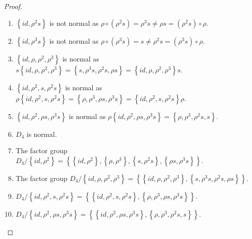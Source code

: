 \documentclass{article}
\theoremstyle{definition}
\begin{document}
\begin{proof}
\begin{enumerate}
			\item $\left\{id, \rho^2 s\right\}$ is not normal as $\rho \circ \left(\rho^2 s\right) = \rho^3 s \not= \rho s = \left(\rho^2 s\right)\circ \rho$.
				
			\item $\left\{id, \rho^3 s\right\}$ is not normal as $\rho \circ \left(\rho^3 s\right) = s \not= \rho^2 s = \left(\rho^3 s\right) \circ \rho$.
				
			\item $\left\{id, \rho, \rho^2, \rho^3 \right\}$ is normal as $s \left\{id, \rho, \rho^2, \rho^3 \right\} = \left\{s, \rho^3 s, \rho^2 s, \rho s \right\} = \left\{id, \rho, \rho^2, \rho^3 \right\} s$. \checkmark 
				
			\item $\left\{id, \rho^2, s, \rho^2 s\right\}$ is normal as $\rho \left\{id, \rho^2, s, \rho^2 s\right\} = \left\{\rho, \rho^3, \rho s, \rho^3 s \right\} = \left\{id, \rho^2, s, \rho^2 s\right\}\rho$. \checkmark
				
			\item $\left\{id, \rho^2, \rho s, \rho^3 s \right\}$ is normal as $\rho \left\{id, \rho^2, \rho s, \rho^3 s \right\} = \left\{\rho, \rho^3, \rho^2 s, s \right\}$. \checkmark 
				
			\item $D_4$ is normal.
				
			\setcounter{enumi}{1}
			\item The factor group $D_4/\left\{id, \rho^2\right\} = \left\{ \left\{ id, \rho^2\right\}, \left\{\rho, \rho^3\right\}, \left\{s, \rho^2 s\right\}, \left\{\rho s, \rho^3 s\right\} \right\}$. 
			
			\setcounter{enumi}{6}
			\item The factor group $D_4/\left\{id, \rho, \rho^2, \rho^3 \right\} = \left\{ \left\{id, \rho, \rho^2, \rho^3 \right\}, \left\{ s, \rho^3 s, \rho^2 s, \rho s \right\} \right\}$.
			
			\item $D_4/\left\{id, \rho^2, s, \rho^2 s\right\} = \left\{ \left\{id, \rho^2, s, \rho^2 s\right\}, \left\{\rho, \rho^3, \rho s, \rho^3 s \right\}\right\}$.
			
			\item $D_4/\left\{id, \rho^2, \rho s, \rho^3 s \right\} = \left\{\left\{id, \rho^2, \rho s, \rho^3 s \right\},\left\{\rho, \rho^3, \rho^2 s, s \right\}\right\}$. 
		\end{enumerate}
	\end{proof}
\end{document}

